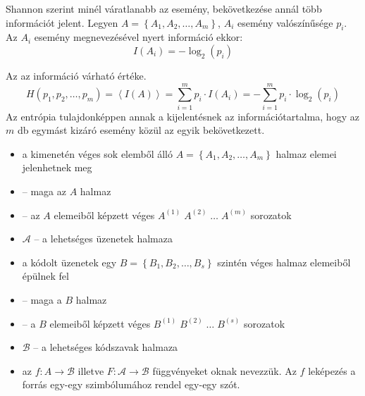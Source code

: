 \documentclass[main.tex]{subfiles}
\begin{document}
  Shannon szerint minél váratlanabb az esemény, bekövetkezése
  annál több információt jelent. Legyen
  $A = \left\{ A_1, A_2, \dots, A_m \right\}$,
  $A_i$ esemény valószínűsége $p_i$.
  Az $A_i$ esemény megnevezésével nyert információ ekkor:
  \begin{equation*}
    I \left( A_i \right) = -\log_2 \left( p_i \right)
  \end{equation*}
  
  Az  az információ várható értéke.
  \begin{equation*}
    H(p_1, p_2, \dots, p_m) = 
    \left\langle I(A) \right\rangle =
    \sum_{i=1}^m p_i \cdot I \left( A_i \right) =
    - \sum_{i=1}^m p_i \cdot \log_2(p_i)
  \end{equation*}
  Az entrópia tulajdonképpen annak a kijelentésnek az információtartalma,
  hogy az $m$ db egymást kizáró esemény közül az egyik bekövetkezett.

  \begin{itemize}
    \item a  kimenetén véges sok
    elemből álló $A = \left\{ A_1, A_2, \dots, A_m \right\}$ halmaz
    elemei jelenhetnek meg

    \item {} – maga az $A$ halmaz
    
    \item {} – az $A$ elemeiből képzett véges
    $A^{(1)} \; A^{(2)} \; \dots \; A^{(m)}$ sorozatok

    \item $\mathcal{A}$ – a lehetséges üzenetek halmaza
    
    \item a kódolt üzenetek egy
    $B = \left\{ B_1, B_2, \dots, B_s \right\}$
    szintén véges halmaz elemeiből épülnek fel

    \item {} – maga a $B$ halmaz
    
    \item {} – a $B$ elemeiből képzett véges
    $B^{(1)} \; B^{(2)} \; \dots \; B^{(s)}$ sorozatok

    \item $\mathcal{B}$ – a lehetséges kódszavak halmaza
    
    \item az $f: A \rightarrow \mathcal{B}$ illetve
    $F: \mathcal{A} \rightarrow \mathcal{B}$ függvényeket
    oknak nevezzük. Az $f$ leképezés
    a forrás egy-egy szimbólumához rendel egy-egy szót.
  \end{itemize}
  
\end{document}
